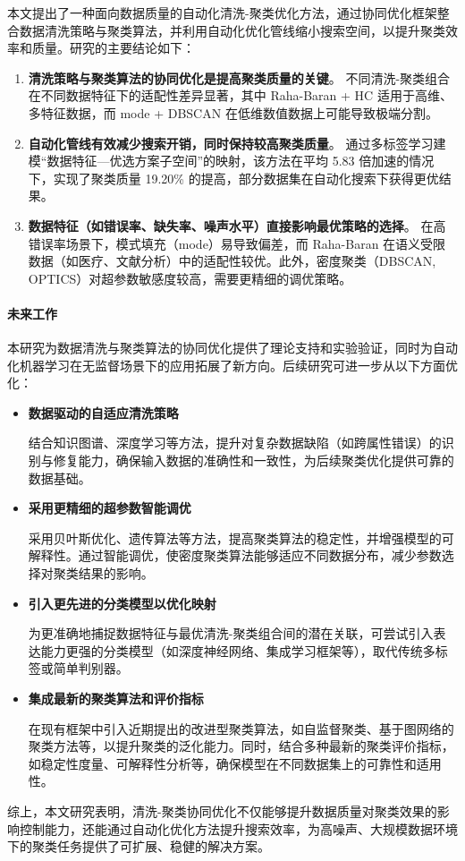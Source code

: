 \documentclass[10pt]{article} %
\numberwithin{equation}{section}
\begin{document}
本文提出了一种面向数据质量的自动化清洗-聚类优化方法，通过协同优化框架整合数据清洗策略与聚类算法，并利用自动化优化管线缩小搜索空间，以提升聚类效率和质量。研究的主要结论如下：

\begin{enumerate}
    \item \textbf{清洗策略与聚类算法的协同优化是提高聚类质量的关键}。  
    不同清洗-聚类组合在不同数据特征下的适配性差异显著，其中 Raha-Baran + HC 适用于高维、多特征数据，而 mode + DBSCAN 在低维数值数据上可能导致极端分割。

    \item \textbf{自动化管线有效减少搜索开销，同时保持较高聚类质量}。  
    通过多标签学习建模“数据特征—优选方案子空间”的映射，该方法在平均 5.83 倍加速的情况下，实现了聚类质量 19.20\% 的提高，部分数据集在自动化搜索下获得更优结果。

    \item \textbf{数据特征（如错误率、缺失率、噪声水平）直接影响最优策略的选择}。  
    在高错误率场景下，模式填充（mode）易导致偏差，而 Raha-Baran 在语义受限数据（如医疗、文献分析）中的适配性较优。此外，密度聚类（DBSCAN, OPTICS）对超参数敏感度较高，需要更精细的调优策略。
\end{enumerate}

\paragraph{未来工作}  
本研究为数据清洗与聚类算法的协同优化提供了理论支持和实验验证，同时为自动化机器学习在无监督场景下的应用拓展了新方向。后续研究可进一步从以下方面优化：

\begin{itemize}
    \item \textbf{数据驱动的自适应清洗策略} 
 
    结合知识图谱、深度学习等方法，提升对复杂数据缺陷（如跨属性错误）的识别与修复能力，确保输入数据的准确性和一致性，为后续聚类优化提供可靠的数据基础。

    \item \textbf{采用更精细的超参数智能调优}  

    采用贝叶斯优化、遗传算法等方法，提高聚类算法的稳定性，并增强模型的可解释性。通过智能调优，使密度聚类算法能够适应不同数据分布，减少参数选择对聚类结果的影响。

    \item \textbf{引入更先进的分类模型以优化映射}  

    为更准确地捕捉数据特征与最优清洗-聚类组合间的潜在关联，可尝试引入表达能力更强的分类模型（如深度神经网络、集成学习框架等），取代传统多标签或简单判别器。

    \item \textbf{集成最新的聚类算法和评价指标}  

    在现有框架中引入近期提出的改进型聚类算法，如自监督聚类、基于图网络的聚类方法等，以提升聚类的泛化能力。同时，结合多种最新的聚类评价指标，如稳定性度量、可解释性分析等，确保模型在不同数据集上的可靠性和适用性。
\end{itemize}

综上，本文研究表明，清洗-聚类协同优化不仅能够提升数据质量对聚类效果的影响控制能力，还能通过自动化优化方法提升搜索效率，为高噪声、大规模数据环境下的聚类任务提供了可扩展、稳健的解决方案。

\begingroup
\small %

    
\endgroup
\end{document}
